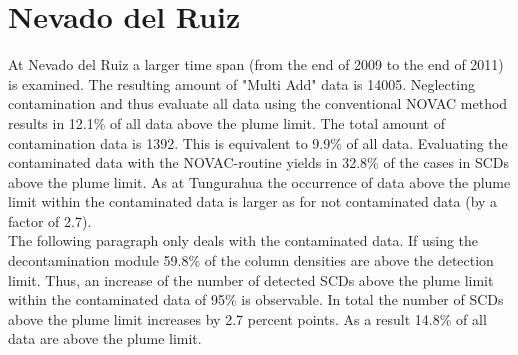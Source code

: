 \documentclass  [
  paper    = a4,
  BCOR     = 10mm,
  twoside,
  fontsize = 12pt,
  fleqn,
  toc      = bibnumbered,
  toc      = listofnumbered,
  numbers  = noendperiod,
  headings = normal,
  listof   = leveldown,
  version  = 3.03
]                                       {scrreprt}
\begin{document}
\section{Nevado del Ruiz}
At Nevado del Ruiz a larger time span (from the end of 2009 to the end of 2011) is examined. The resulting amount of "Multi Add" data is 14005.
Neglecting contamination and thus evaluate all data using the conventional NOVAC method results in 12.1\% of all data above the plume limit. 
The total amount of contamination data is 1392. This is equivalent to 9.9\% of all data. Evaluating the contaminated data with the NOVAC-routine yields in 32.8\% of the cases in  SCDs above the plume limit. As at Tungurahua the occurrence of data above the plume limit within the contaminated data is larger as for not contaminated data (by a factor of 2.7).\\
The following paragraph only deals with the contaminated data.
If using the decontamination module 59.8\% of the  column densities are above the detection limit. Thus, an increase of the number of detected  SCDs above the plume limit within the contaminated data of 95\% is observable. In total the number of  SCDs above the plume limit increases by 2.7 percent points. As a result 14.8\% of all data are above the plume limit.\\
\FloatBarrier


%
%
%
\end{document}
